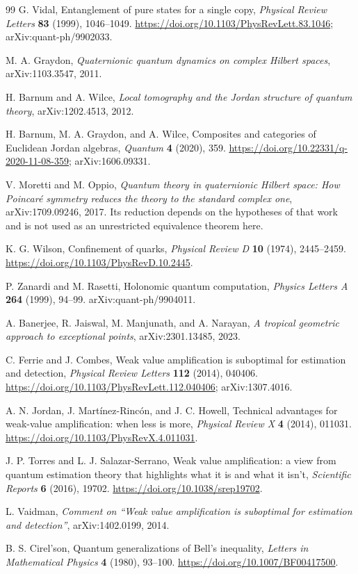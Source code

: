 \documentclass[11pt,oneside]{article}
\numberwithin{equation}{section}
\theoremstyle{plain}
\theoremstyle{definition}
\theoremstyle{remark}
\begin{document}
\begin{thebibliography}{99}
G. Vidal, Entanglement of pure states for a single copy, \emph{Physical Review Letters} \textbf{83} (1999), 1046--1049. \url{https://doi.org/10.1103/PhysRevLett.83.1046}; arXiv:quant-ph/9902033.

M. A. Graydon, \emph{Quaternionic quantum dynamics on complex Hilbert spaces}, arXiv:1103.3547, 2011.

H. Barnum and A. Wilce, \emph{Local tomography and the Jordan structure of quantum theory}, arXiv:1202.4513, 2012.

H. Barnum, M. A. Graydon, and A. Wilce, Composites and categories of Euclidean Jordan algebras, \emph{Quantum} \textbf{4} (2020), 359. \url{https://doi.org/10.22331/q-2020-11-08-359}; arXiv:1606.09331.

V. Moretti and M. Oppio, \emph{Quantum theory in quaternionic Hilbert space: How Poincar\'e symmetry reduces the theory to the standard complex one}, arXiv:1709.09246, 2017. Its reduction depends on the hypotheses of that work and is not used as an unrestricted equivalence theorem here.

K. G. Wilson, Confinement of quarks, \emph{Physical Review D} \textbf{10} (1974), 2445--2459. \url{https://doi.org/10.1103/PhysRevD.10.2445}.

P. Zanardi and M. Rasetti, Holonomic quantum computation, \emph{Physics Letters A} \textbf{264} (1999), 94--99. arXiv:quant-ph/9904011.

A. Banerjee, R. Jaiswal, M. Manjunath, and A. Narayan, \emph{A tropical geometric approach to exceptional points}, arXiv:2301.13485, 2023.

C. Ferrie and J. Combes, Weak value amplification is suboptimal for estimation and detection, \emph{Physical Review Letters} \textbf{112} (2014), 040406. \url{https://doi.org/10.1103/PhysRevLett.112.040406}; arXiv:1307.4016.

A. N. Jordan, J. Mart\'inez-Rinc\'on, and J. C. Howell, Technical advantages for weak-value amplification: when less is more, \emph{Physical Review X} \textbf{4} (2014), 011031. \url{https://doi.org/10.1103/PhysRevX.4.011031}.

J. P. Torres and L. J. Salazar-Serrano, Weak value amplification: a view from quantum estimation theory that highlights what it is and what it isn't, \emph{Scientific Reports} \textbf{6} (2016), 19702. \url{https://doi.org/10.1038/srep19702}.

L. Vaidman, \emph{Comment on ``Weak value amplification is suboptimal for estimation and detection''}, arXiv:1402.0199, 2014.

B. S. Cirel'son, Quantum generalizations of Bell's inequality, \emph{Letters in Mathematical Physics} \textbf{4} (1980), 93--100. \url{https://doi.org/10.1007/BF00417500}.

\end{thebibliography}
\end{document}
